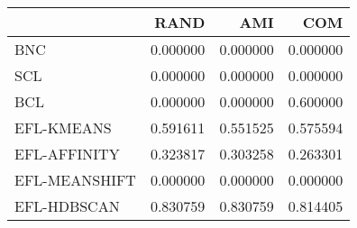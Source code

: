 \begin{tabular}{lrrr}
\toprule
 & RAND & AMI & COM \\
\midrule
BNC & 0.000000 & 0.000000 & 0.000000 \\
SCL & 0.000000 & 0.000000 & 0.000000 \\
BCL & 0.000000 & 0.000000 & 0.600000 \\
EFL-KMEANS & 0.591611 & 0.551525 & 0.575594 \\
EFL-AFFINITY & 0.323817 & 0.303258 & 0.263301 \\
EFL-MEANSHIFT & 0.000000 & 0.000000 & 0.000000 \\
EFL-HDBSCAN & 0.830759 & 0.830759 & 0.814405 \\
\bottomrule
\end{tabular}

